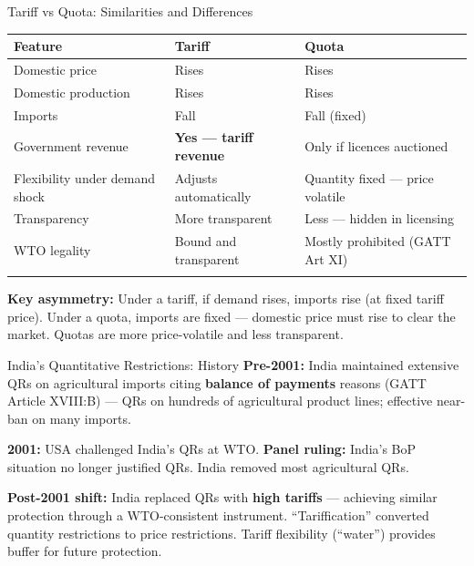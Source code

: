 \documentclass[
  ignorenonframetext,
  aspectratio=169,
]{beamer}
\makeatletter
\let\quarto@originallabel\label
\DeclareRobustCommand*{\label}[1]{\quarto@originallabel{#1}}
\makeatother
\begin{document}
\begin{frame}{Tariff vs Quota: Similarities and Differences}
\label{tariff-vs-quota-similarities-and-differences}
\begin{longtable}[]{@{}
  >{\raggedright\arraybackslash}p{}
  >{\raggedright\arraybackslash}p{}
  >{\raggedright\arraybackslash}p{}@{}}
\toprule\noalign{}
\begin{minipage}[b]{\linewidth}\raggedright
Feature
\end{minipage} & \begin{minipage}[b]{\linewidth}\raggedright
Tariff
\end{minipage} & \begin{minipage}[b]{\linewidth}\raggedright
Quota
\end{minipage} \\
\midrule\noalign{}
\endhead
Domestic price & Rises & Rises \\
Domestic production & Rises & Rises \\
Imports & Fall & Fall (fixed) \\
Government revenue & \textbf{Yes --- tariff revenue} & Only if licences
auctioned \\
Flexibility under demand shock & Adjusts automatically & Quantity fixed
--- price volatile \\
Transparency & More transparent & Less --- hidden in licensing \\
WTO legality & Bound and transparent & Mostly prohibited (GATT Art
XI) \\
\bottomrule\noalign{}
\end{longtable}

\textbf{Key asymmetry:} Under a tariff, if demand rises, imports rise
(at fixed tariff price). Under a quota, imports are fixed --- domestic
price must rise to clear the market. Quotas are more price-volatile and
less transparent.
\end{frame}

\begin{frame}{India's Quantitative Restrictions: History}
\label{indias-quantitative-restrictions-history}
\textbf{Pre-2001:} India maintained extensive QRs on agricultural
imports citing \textbf{balance of payments} reasons (GATT Article
XVIII:B) --- QRs on hundreds of agricultural product lines; effective
near-ban on many imports.

\textbf{2001:} USA challenged India's QRs at WTO. \textbf{Panel ruling:}
India's BoP situation no longer justified QRs. India removed most
agricultural QRs.

\textbf{Post-2001 shift:} India replaced QRs with \textbf{high tariffs}
--- achieving similar protection through a WTO-consistent instrument.
``Tariffication'' converted quantity restrictions to price restrictions.
Tariff flexibility (``water'') provides buffer for future protection.
\end{frame}
\end{document}
